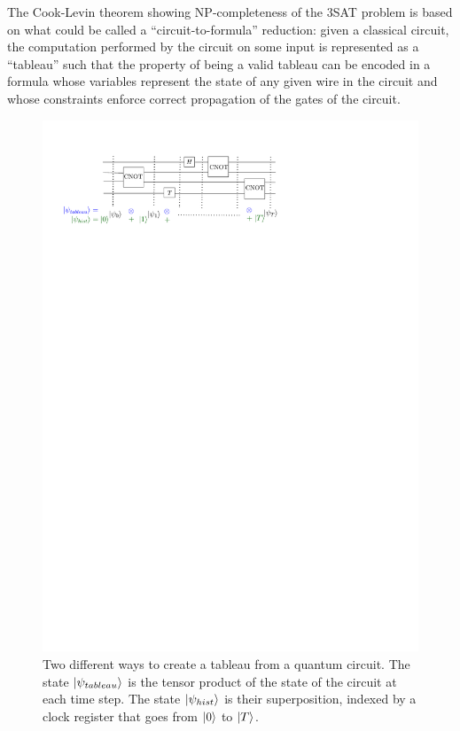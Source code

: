 The Cook-Levin theorem showing NP-completeness of the $3$SAT problem is based on what could be called a ``circuit-to-formula'' reduction: given a classical circuit, the computation performed by the circuit on some input is represented as a ``tableau'' such that the property of being a valid tableau can be encoded in a formula whose variables represent the state of any given wire in the circuit and whose constraints enforce correct propagation of the gates of the circuit. 

\begin{figure}[htb!]
\centering%
\includegraphics[scale=1, angle = 0]{qtableau.pdf}
\caption{Two different ways to create a tableau from a quantum circuit. The state $|\psi_{tableau}\rangle$ is the tensor product of the state of the circuit at each time step. The state $|\psi_{hist}\rangle$ is their superposition, indexed by a clock register that goes from $|0\rangle$ to $|T\rangle$.}
\label{fig:q-tableau}
\end{figure}


